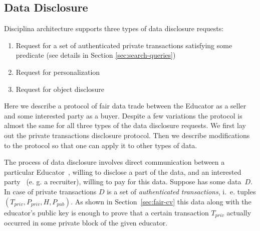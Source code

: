\subsection{Data Disclosure}
\label{sec:DataDisclosure}

Disciplina architecture supports three types of data disclosure requests:
\begin{enumerate}
  \item Request for a set of authenticated private transactions satisfying some predicate (see details in Section \ref{sec:search-queries})
  \item Request for personalization
  \item Request for object disclosure
\end{enumerate}

Here we describe a protocol of fair data trade between the Educator as a seller and some interested party as a buyer. Despite a few variations the protocol is almost the same for all three types of the data disclosure requests. We first lay out the private transactions disclosure protocol. Then we describe modifications to the protocol so that one can apply it to other types of data.

The process of data disclosure involves direct communication between a particular Educator~, willing to disclose a part of the data, and an interested party~ (e. g. a recruiter), willing to pay for this data. Suppose  has some data~$D$. In case of private transactions $D$ is a set of \textit{authenticated transactions}, i.~e. tuples $(T_{priv}, P_{priv}, H, P_{pub})$. As shown in Section~\ref{sec:fair-cv} this data along with the educator's public key is enough to prove that a certain transaction $T_{priv}$ actually occurred in some private block of the given educator.

